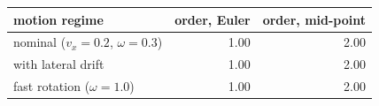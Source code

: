 \begin{tabular}{lrr}
  \toprule
  motion regime & order, Euler & order, mid-point \\
  \midrule
  nominal ($v_x=0.2$, $\omega=0.3$) & 1.00 & 2.00 \\
  with lateral drift & 1.00 & 2.00 \\
  fast rotation ($\omega=1.0$) & 1.00 & 2.00 \\
  \bottomrule
\end{tabular}
